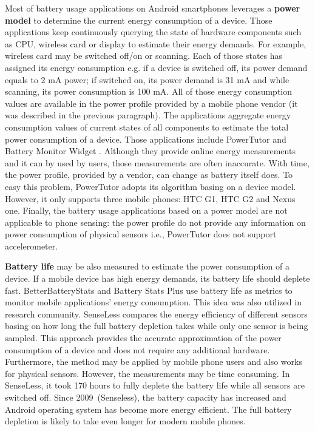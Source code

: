 Most of battery usage applications on Android smartphones leverages a \textbf{power model} to determine the current energy consumption of a device. Those applications keep continuously querying the state of hardware components such as CPU, wireless card or display to estimate their energy demands. For example, wireless card may be switched off/on or scanning. Each of those states has assigned its energy consumption e.g. if a device is switched off, its power demand equals to 2 mA power; if switched on, its power demand is 31 mA and while scanning, its power consumption is 100 mA. All of those energy consumption values are available in the power profile provided by a mobile phone vendor (it was described in the previous paragraph). The applications aggregate energy consumption values of current states of all components to estimate the total power consumption of a device. Those applications include PowerTutor \cite{zhang:powertutor} and Battery Monitor Widget \cite{googleplay:batterymonitorwidget}. Although they provide online energy measurements and it can by used by users, those measurements are often inaccurate. With time, the power profile, provided by a vendor, can change as battery itself does. To easy this problem, PowerTutor adopts its algorithm basing on a device model. However, it only supports three mobile phones: HTC G1, HTC G2 and Nexus one. Finally, the battery usage applications based on a power model are not applicable to phone sensing: the power profile do not provide any information on power consumption of physical sensors i.e., PowerTutor does not support accelerometer.

\textbf{Battery life} may be also measured to estimate the power consumption of a device. If a mobile device has high energy demands, its battery life should deplete fast. BetterBatteryStats \cite{googleplay:betterbatterystats} and Battery Stats Plus \cite{googleplay:batterystatsplus} use battery life as metrics to monitor mobile applications' energy consumption. This idea was also utilized in research community. SenseLess \cite{benabdesslem:senseless} compares the energy efficiency of different sensors basing on how long the full battery depletion takes while only one sensor is being sampled. This approach provides the accurate approximation of the power consumption of a device and does not require any additional hardware. Furthermore, the method may be applied by mobile phone users and also works for physical sensors. However, the measurements may be time consuming. In SenseLess, it took 170 hours to fully deplete the battery life while all sensors are switched off. Since 2009\ (Senseless), the battery capacity has increased and Android operating system has become more energy efficient. The full battery depletion is likely to take even longer for modern mobile phones.

